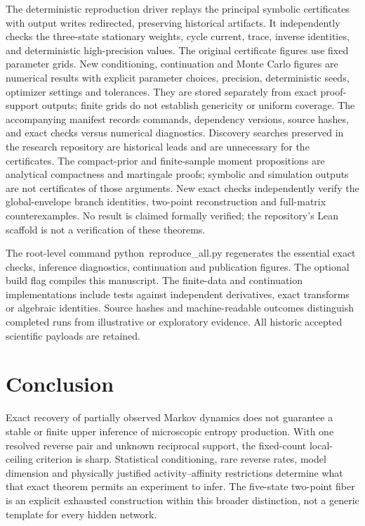\documentclass[aps,pre,onecolumn,11pt,longbibliography,notitlepage]{revtex4-2}
\newcommand{\1}{\mathbf 1}
\begin{document}
The deterministic reproduction driver replays the principal symbolic certificates with output writes redirected, preserving historical artifacts. It independently checks the three-state stationary weights, cycle current, trace, inverse identities, and deterministic high-precision values. The original certificate figures use fixed parameter grids. New conditioning, continuation and Monte Carlo figures are numerical results with explicit parameter choices, precision, deterministic seeds, optimizer settings and tolerances. They are stored separately from exact proof-support outputs; finite grids do not establish genericity or uniform coverage. The accompanying manifest records commands, dependency versions, source hashes, and exact checks versus numerical diagnostics. Discovery searches preserved in the research repository are historical leads and are unnecessary for the certificates. The compact-prior and finite-sample moment propositions are analytical compactness and martingale proofs; symbolic and simulation outputs are not certificates of those arguments. New exact checks independently verify the global-envelope branch identities, two-point reconstruction and full-matrix counterexamples. No result is claimed formally verified; the repository's Lean scaffold is not a verification of these theorems.


The root-level command \mbox{python reproduce\_all.py} regenerates the essential exact checks, inference diagnostics, continuation and publication figures. The optional build flag compiles this manuscript. The finite-data and continuation implementations include tests against independent derivatives, exact transforms or algebraic identities. Source hashes and machine-readable outcomes distinguish completed runs from illustrative or exploratory evidence. All historic accepted scientific payloads are retained.

\section{Conclusion}
Exact recovery of partially observed Markov dynamics does not guarantee a stable or finite upper inference of microscopic entropy production. With one resolved reverse pair and unknown reciprocal support, the fixed-count local-ceiling criterion is sharp. Statistical conditioning, rare reverse rates, model dimension and physically justified activity--affinity restrictions determine what that exact theorem permits an experiment to infer. The five-state two-point fiber is an explicit exhausted construction within this broader distinction, not a generic template for every hidden network.
\end{document}
